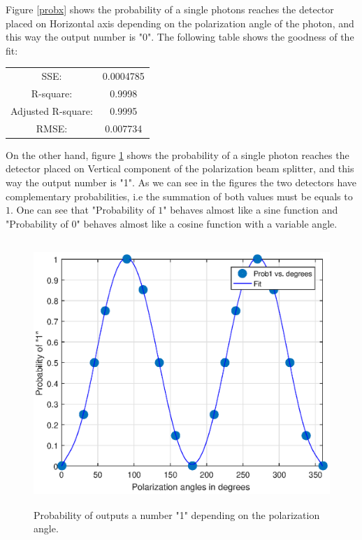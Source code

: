 Figure \ref{probx} shows the probability of a single photons reaches the detector placed on Horizontal axis depending on the polarization angle of the photon, and this way the output number is "0". The following table shows the goodness of the fit:
\begin{table}[H]
\centering
\label{tab:goodnessfitprob0}
    \begin{tabular}{c|c}
      SSE:                  & 0.0004785\\
      R-square:             &0.9998\\
      Adjusted R-square:    &0.9995\\
      RMSE:                 &0.007734
  \end{tabular}
\end{table}

On the other hand, figure \ref{proby} shows the probability of a single photon reaches the detector placed on Vertical component of the polarization beam splitter, and this way the output number is "1". As we can see in the figures the two detectors have complementary probabilities, i.e the summation of both values must be equals to $1$. One can see that "Probability of $1$" \space behaves almost like a sine function and "Probability of 0" \space behaves almost like a cosine function with a variable angle.

\begin{figure}[H]
    \centering
        \includegraphics[width=15cm,height=10cm]{./sdf/qrng/figures_raw/prob1.eps}
    \caption{Probability of outputs a number "1" \space depending on the polarization angle.}\label{proby}
\end{figure}

